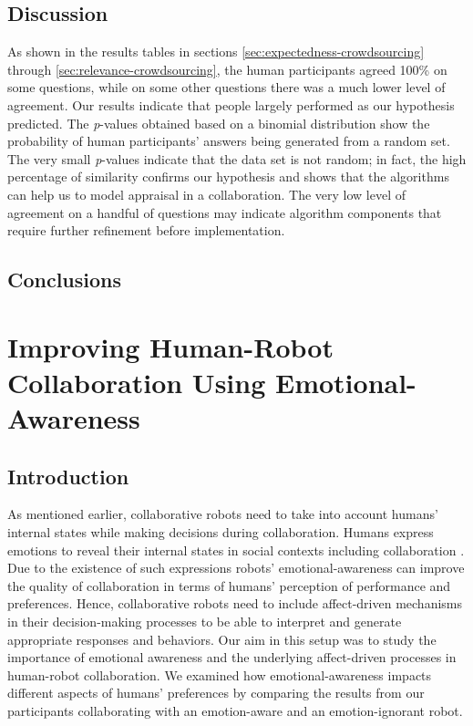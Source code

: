 \documentclass[12pt]{report}
\begin{document}
\section{Discussion}
\label{sec:discussion-crowdsourcing}
As shown in the results tables in sections \ref{sec:expectedness-crowdsourcing}
through \ref{sec:relevance-crowdsourcing}, the human participants agreed 100\%
on some questions, while on some other questions there was a much lower level of
agreement. Our results indicate that people largely performed as our hypothesis
predicted. The \textit{p}-values obtained based on a binomial distribution show
the probability of human participants' answers being generated from a random
set. The very small \textit{p}-values indicate that the data set is not random;
in fact, the high percentage of similarity confirms our hypothesis and shows
that the algorithms can help us to model appraisal in a collaboration. The very
low level of agreement on a handful of questions may indicate algorithm
components that require further refinement before implementation. 

\section{Conclusions}
\label{sec:conclusions-crowdsourcing}

\chapter{Improving Human-Robot Collaboration Using Emotional-Awareness}
\label{ch:awareness}

\section{Introduction}

As mentioned earlier, collaborative robots need to take into account humans'
internal states while making decisions during collaboration. Humans express
emotions to reveal their internal states in social contexts including
collaboration \cite{breazeal:sociable-interactive-robots}. Due to the existence
of such expressions robots' emotional-awareness can improve the quality of
collaboration in terms of humans' perception of performance and preferences.
Hence, collaborative robots need to include affect-driven mechanisms in their
decision-making processes to be able to interpret and generate appropriate
responses and behaviors. Our aim in this setup was to study the importance of
emotional awareness and the underlying affect-driven processes in human-robot
collaboration. We examined how emotional-awareness impacts different aspects of
humans' preferences by comparing the results from our participants collaborating
with an emotion-aware and an emotion-ignorant robot.
\end{document}
